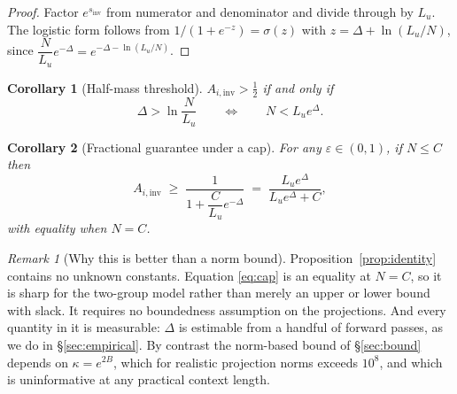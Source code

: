 \documentclass[11pt,a4paper]{article}
\theoremstyle{plain}
\newtheorem{corollary}{Corollary}
\theoremstyle{definition}
\theoremstyle{remark}
\newtheorem{remark}{Remark}
\newcommand{\Ainv}{A_{i,\mathrm{inv}}}
\begin{document}
\begin{proof}
Factor $e^{s_{\mathrm{inv}}}$ from numerator and denominator and divide through
by $L_u$. The logistic form follows from
$1/(1+e^{-z}) = \sigma(z)$ with
$z = \Delta + \ln(L_u/N)$, since
$\dfrac{N}{L_u}e^{-\Delta} = e^{-\Delta - \ln(L_u/N)}$.
\end{proof}

\begin{corollary}[Half-mass threshold]
\label{cor:half}
$\Ainv > \tfrac12$ if and only if
\begin{equation}
  \Delta > \ln\frac{N}{L_u}
  \qquad\Longleftrightarrow\qquad
  N < L_u e^{\Delta}.
\end{equation}
\end{corollary}

\begin{corollary}[Fractional guarantee under a cap]
\label{cor:cap}
For any $\varepsilon \in (0,1)$, if $N \le C$ then
\begin{equation}
  \Ainv \;\ge\; \frac{1}{1 + \dfrac{C}{L_u}e^{-\Delta}}
  \;=\; \frac{L_u e^{\Delta}}{L_u e^{\Delta} + C},
  \label{eq:cap}
\end{equation}
with equality when $N = C$.
\end{corollary}

\begin{remark}[Why this is better than a norm bound]
\label{rem:better}
Proposition~\ref{prop:identity} contains no unknown constants. Equation
\eqref{eq:cap} is an equality at $N=C$, so it is sharp for the two-group model
rather than merely an upper or lower bound with slack. It requires no boundedness
assumption on the projections. And every quantity in it is measurable:
$\Delta$ is estimable from a handful of forward passes, as we do in
\S\ref{sec:empirical}. By contrast the norm-based bound of \S\ref{sec:bound}
depends on $\kappa = e^{2B}$, which for realistic projection norms exceeds
$10^{8}$, and which is uninformative at any practical context length.
\end{remark}
\end{document}
